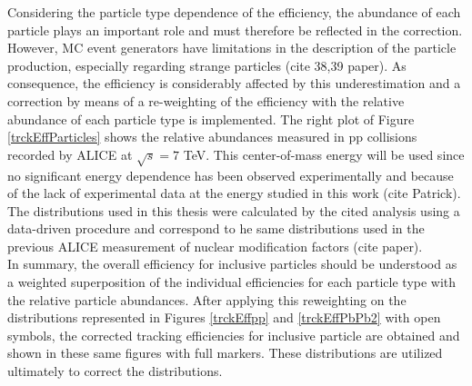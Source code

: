 \documentclass[12pt,a4paper]{report}
\begin{document}
Considering the particle type dependence of the efficiency, the abundance of each particle plays an important role and must therefore be reflected in the correction. However, MC event generators have limitations in the description of the particle production, especially regarding strange particles (cite 38,39 paper). As consequence, the efficiency is considerably affected by this underestimation and a correction by means of a re-weighting of the efficiency with the relative abundance of each particle type is implemented. The right plot of Figure \ref{trckEffParticles} shows the relative abundances measured in pp collisions recorded by ALICE at $\sqrt{s} = 7$ TeV. This center-of-mass energy will be used since no significant energy dependence has been observed experimentally and because of the lack of experimental data at the energy studied in this work (cite Patrick). The distributions used in this thesis were calculated by the cited analysis using a data-driven procedure and correspond to he same distributions used in the previous ALICE measurement of nuclear modification factors (cite paper).\\
In summary, the overall efficiency for inclusive particles should be understood as a weighted superposition of the individual efficiencies for each particle type with the relative particle abundances. After applying this reweighting on the distributions represented in Figures \ref{trckEffpp} and \ref{trckEffPbPb2} with open symbols, the corrected tracking efficiencies for inclusive particle are obtained and shown in these same figures with full markers. These distributions are utilized ultimately to correct the \pt distributions. 
\end{document}
